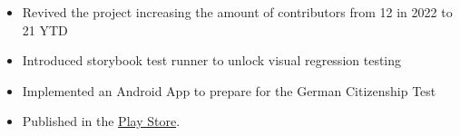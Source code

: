 \documentclass[10pt,a4paper,ragged2e,withhyper]{altacv}
\begin{document}
\begin{paracol}{2}



\begin{itemize}

  \item Revived the project increasing the amount of contributors from 12 in 2022 to 21 YTD
  \item Introduced storybook test runner to unlock visual regression testing
\end{itemize}

\medskip


\begin{itemize}
  \item Implemented an Android App to prepare for the German Citizenship Test
  \item Published in the \href{https://play.google.com/store/apps/details?id=com.nrieble.quizapp}{Play Store}.
\end{itemize}




\medskip



\newpage

\switchcolumn




\end{paracol}
\end{document}
